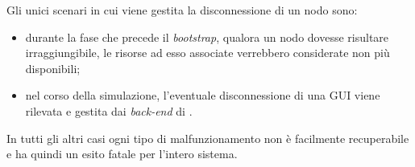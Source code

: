 Gli unici scenari in cui viene gestita la disconnessione di un nodo sono:
\begin{itemize}
\item durante la fase che precede il \textit{bootstrap}, qualora un nodo dovesse risultare irraggiungibile, le risorse ad esso associate verrebbero considerate non più disponibili;
\item nel corso della simulazione, l'eventuale disconnessione di una GUI viene rilevata e gestita dai \textit{back-end} di \evdisp{}.
\end{itemize}
In tutti gli altri casi ogni tipo di malfunzionamento non è facilmente recuperabile e ha quindi un esito fatale per l'intero sistema.
